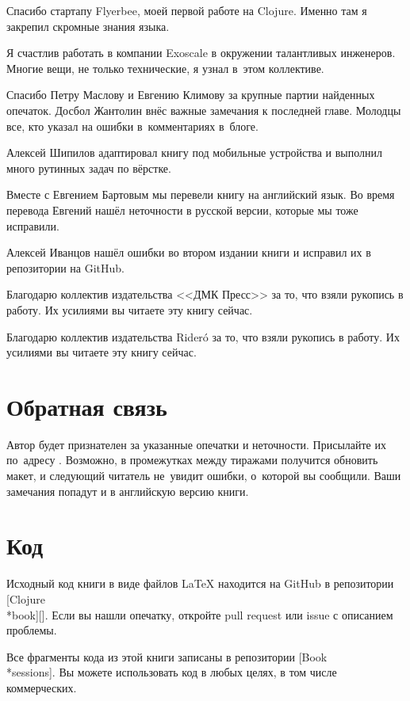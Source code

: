Спасибо стартапу Flyerbee, моей первой работе на Clojure. Именно там я закрепил
скромные знания языка.

Я счастлив работать в компании Exoscale в окружении талантливых
инженеров. Многие вещи, не только технические, я узнал в~этом коллективе.

Спасибо Петру Маслову и Евгению Климову за крупные партии найденных
опечаток. Досбол Жантолин внёс важные замечания к последней главе. Молодцы все,
кто указал на ошибки в~комментариях в~блоге.

Алексей Шипилов адаптировал книгу под мобильные устройства и выполнил много
рутинных задач по вёрстке.

Вместе с Евгением Бартовым мы перевели книгу на английский язык. Во время
перевода Евгений нашёл неточности в русской версии, которые мы тоже исправили.

Алексей Иванцов нашёл ошибки во втором издании книги и исправил их в репозитории
на GitHub.

\ifdmk
Благодарю коллектив издательства <<ДМК Пресс>> за то, что взяли рукопись в
работу. Их усилиями вы читаете эту книгу сейчас.
\fi

\ifridero
Благодарю коллектив издательства Rider\'{o} за то, что взяли рукопись в
работу. Их усилиями вы читаете эту книгу сейчас.
\fi

\section*{Обратная связь}

Автор будет признателен за указанные опечатки и неточности. Присылайте их
по~адресу \EMAILLINK. Возможно, в промежутках между тиражами получится обновить
макет, и следующий читатель не~увидит ошибки, о~которой вы сообщили. Ваши
замечания попадут и в английскую версию книги.

\section*{Код}

\iflarge
\setlength{\marginparoffset}{-10mm}
\fi

Исходный код книги в виде файлов \LaTeX{} находится на GitHub в репозитории
[Clojure\\*book][\marginparoffset]. Если
вы нашли опечатку, откройте pull request или issue с описанием проблемы.

Все фрагменты кода из этой книги записаны в репозитории
[Book\\*sessions]. Вы
можете использовать код в любых целях, в том числе коммерческих.

